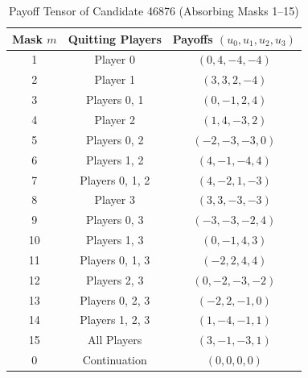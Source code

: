 \documentclass[11pt,a4paper]{article}
\theoremstyle{definition}
\begin{document}
\begin{table}[h]
\centering
\caption{Payoff Tensor of Candidate 46876 (Absorbing Masks 1--15)}
\begin{tabular}{ccc}
\toprule
Mask $m$ & Quitting Players & Payoffs $(u_0, u_1, u_2, u_3)$ \\
\midrule
1  & Player 0          & $(0, 4, -4, -4)$ \\
2  & Player 1          & $(3, 3, 2, -4)$ \\
3  & Players 0, 1      & $(0, -1, 2, 4)$ \\
4  & Player 2          & $(1, 4, -3, 2)$ \\
5  & Players 0, 2      & $(-2, -3, -3, 0)$ \\
6  & Players 1, 2      & $(4, -1, -4, 4)$ \\
7  & Players 0, 1, 2   & $(4, -2, 1, -3)$ \\
8  & Player 3          & $(3, 3, -3, -3)$ \\
9  & Players 0, 3      & $(-3, -3, -2, 4)$ \\
10 & Players 1, 3      & $(0, -1, 4, 3)$ \\
11 & Players 0, 1, 3   & $(-2, 2, 4, 4)$ \\
12 & Players 2, 3      & $(0, -2, -3, -2)$ \\
13 & Players 0, 2, 3   & $(-2, 2, -1, 0)$ \\
14 & Players 1, 2, 3   & $(1, -4, -1, 1)$ \\
15 & All Players       & $(3, -1, -3, 1)$ \\
0  & Continuation      & $(0, 0, 0, 0)$ \\
\bottomrule
\end{tabular}
\end{table}
\end{document}
